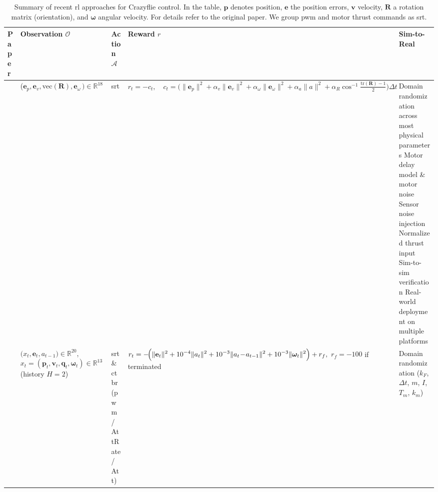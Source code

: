 \begin{table*}[!b]
  \centering
  \caption[Summary of \gls{rl} approaches]{Summary of recent \gls{rl} approaches for Crazyflie control. In the table, $\mathbf{p}$ denotes position, $\mathbf{e}$ the position errors, $\mathbf{v}$ velocity, $\mathbf{R}$ a rotation matrix (orientation), and $\boldsymbol{\omega}$ angular velocity. For details refer to the original paper. We group \gls{pwm} and motor thrust commands as \gls{srt}.}
  \label{tab:rl_comparison}
  \scriptsize
  \begin{tabularx}{\textwidth}{p{0.7cm} p{3.0cm} p{1.3cm} p{3.5cm} X}
    \toprule
    \rowcolor{white}
    \textbf{Paper} & \textbf{Observation $\mathcal{O}$} & \textbf{Action $\mathcal{A}$} & \textbf{Reward $r$} & \textbf{Sim-to-Real} \\
    \midrule
    \cite{molchanov_sim--multi-real_2019} & 
    ($\mathbf e_p,\mathbf e_v,\mathrm{vec}(\mathbf{R}),\mathbf e_\omega\,)\in\mathbb R^{18} $ & 
    \gls{srt}  & 
      \(\displaystyle
    r_t=-c_t,\quad
    c_t=\bigl(\|\mathbf e_p\|^2+\alpha_v\|\mathbf e_v\|^2+\alpha_\omega\|\mathbf e_\omega\|^2+\alpha_a\|a\|^2+\alpha_R\cos^{-1}\!\tfrac{\mathrm{tr}(\mathbf{R})-1}{2}\bigr)\Delta t
    \) 
    &
     Domain randomization across most physical parameters\newline
      Motor delay model \& motor noise\newline
      Sensor noise injection\newline
      Normalized thrust input\newline
      Sim-to-sim verification\newline
      Real-world deployment on multiple platforms  \\
    \cite{gronauer_using_2022} & 
    $\bigl(x_t,\mathbf{e}_t,a_{t-1}\bigr)\!\in\!\mathbb{R}^{20}$, \newline 
    $x_t=(\mathbf{p}_t,\mathbf{v}_t,\mathbf{q}_t,\boldsymbol{\omega}_t)\!\in\!\mathbb{R}^{13}$ \newline 
    (history $H{=}2$) & 
    \gls{srt} \& \gls{ctbr}\newline 
    (\gls{pwm} / AttRate / Att) & 
    $\displaystyle r_t= -\!\Bigl(\|\mathbf{e}_t\|^{2} + 10^{-4}\|a_t\|^{2} + 10^{-3}\|a_t\!-\!a_{t-1}\|^{2} + 10^{-3}\|\boldsymbol{\omega}_t\|^{2}\Bigr) + r_f,$ \newline 
    $r_f = -100$ if terminated &
    Domain randomization ($k_F$, $\Delta t$, $m$, $I$, $T_m$, $k_m$) \newline

\end{tabularx}
\end{table*}
